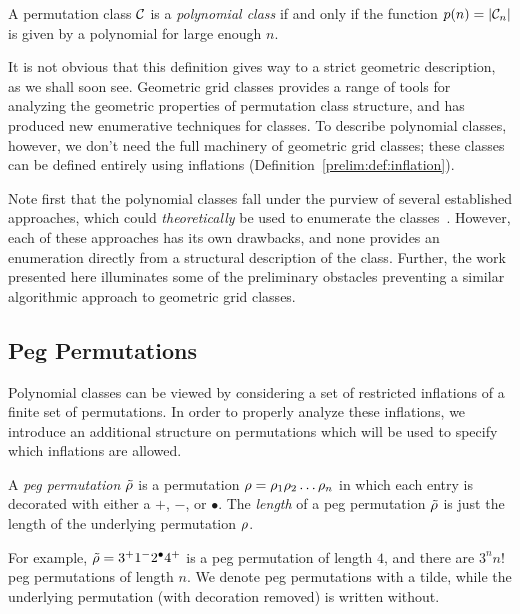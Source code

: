   \begin{definition} \label{polyclass:def:polyclass}
    A permutation class $\mathcal{C}$ is a \emph{polynomial class} if and only if the
    function $p(n) = |\mathcal{C}_n|$ is given by a polynomial for large enough $n$. 
  \end{definition} 

  It is not obvious that this definition gives way to a strict geometric
  description, as we shall soon see. Geometric grid classes provides a range of
  tools for analyzing the geometric properties of permutation class structure,
  and has produced new enumerative techniques for classes. To describe
  polynomial classes, however, we don't need the full machinery of geometric
  grid classes; these classes can be defined entirely using inflations
  (Definition~\ref{prelim:def:inflation}). 

  Note first that the polynomial classes fall under the purview of several
  established approaches, which could \emph{theoretically} be used to enumerate
  the classes~\cite{GridClasses, RegInsEnc, Atkinson2005, Linton2005,
  Brignall2008}. However, each of these approaches has its own drawbacks, and
  none provides an enumeration directly from a structural description of the
  class. Further, the work presented here illuminates some of the preliminary
  obstacles preventing a similar algorithmic approach to geometric grid
  classes. 
  


  \subsection{Peg Permutations}

    Polynomial classes can be viewed by considering a set of restricted
    inflations of a finite set of permutations. In order to properly analyze
    these inflations, we introduce an additional structure on permutations which
    will be used to specify which inflations are allowed. 

    \begin{definition} \label{polyclass:def:pegperm}
      A \emph{peg permutation} $\tilde{\rho}$ is a permutation $\rho = \rho_1 \rho_2 \dots
      \rho_n$ in which each entry is decorated with either a $+$, $-$, or
      $\bullet$. The \emph{length} of a peg permutation $\tilde{\rho}$ is just the
      length of the underlying permutation $\rho$. 
    \end{definition}
    
    For example, $ \tilde{\rho} = 3^+ 1^- 2^\bullet 4^+$ is a peg permutation of length $4$,
    and there are $3^n n!$ peg permutations of length $n$. 
    We denote peg permutations with a tilde, while the underlying permutation
    (with decoration removed) is written without.


